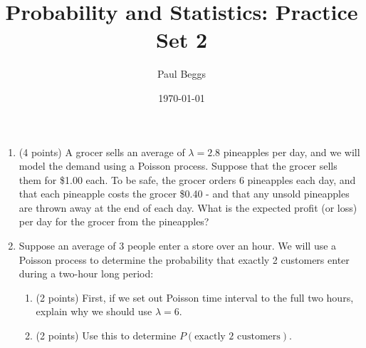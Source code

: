 \documentclass[11pt]{article}
\title{Probability and Statistics: Practice Set 2}
\author{Paul Beggs}
\date{\today}
\newenvironment{solution}
  {\textit{Solution.}}
\newcommand{\sol}[1]{
    \begin{customframedproof}[linecolor=orangehdx!75,]
        \begin{solution}
        #1
        \end{solution}
    \end{customframedproof}
}
\begin{document}
\begin{enumerate}
    \item (4 points) A grocer sells an average of \(\lambda = 2.8\) pineapples per day, and we will model the demand using a Poisson process. Suppose that the grocer sells them for \$1.00 each. To be safe, the grocer orders 6 pineapples each day, and that each pineapple costs the grocer \$0.40 - and that any unsold pineapples are thrown away at the end of each day. What is the expected profit (or loss) per day for the grocer from the pineapples?
\newpage

    \item Suppose an average of 3 people enter a store over an hour. We will use a Poisson process to determine the probability that exactly 2 customers enter during a two-hour long period:
    \begin{enumerate}
        \item (2 points) First, if we set out Poisson time interval to the full two hours, explain why we should use \(\lambda = 6\).
        \item (2 points) Use this to determine \(P(\text{exactly 2 customers})\).
        

\end{enumerate}
\end{enumerate}
\end{document}
